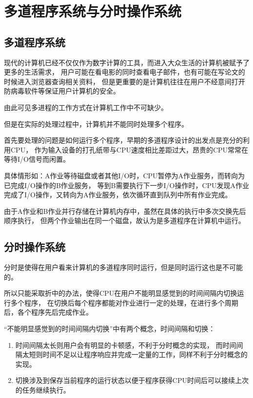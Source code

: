 \section{多道程序系统与分时操作系统}

\subsection{多道程序系统}

现代的计算机已经不仅仅作为数字计算的工具，而进入大众生活的计算机被赋予了更多的生活需求，
用户可能在看电影的同时查看电子邮件，也有可能在写论文的时候进入浏览器查询相关资料，
但是更重要的是计算机往往在用户不经意间打开防病毒软件等保证用户计算机的安全。

由此可见多进程的工作方式在计算机工作中不可缺少。

但是在实际的处理过程中，计算机并不能同时处理多个程序。

首先要处理的问题是如何运行多个程序，早期的多道程序设计的出发点是充分的利用CPU，
作为输入设备的打孔纸带与CPU速度相比差距过大，昂贵的CPU常常在等待I/O信号而闲置。

具体情形如：A作业等待磁盘或者其他I/O时，CPU暂停为A作业服务，而转向为已完成I/O操作的B作业服务，
等到B需要执行下一步I/O操作时，CPU发现A作业完成了I/O操作，又转向为A作业服务，依次循环直到队列中所有作业完成。

由于A作业和B作业并行存储在计算机内存中，虽然在具体的执行中多次交换先后顺序执行，
但两个作业输出在同一个磁盘，故认为是多道程序在计算机中运行。

\subsection{分时操作系统}

分时是使得在用户看来计算机的多道程序同时运行，但是同时运行这也是不可能的。

所以只能采取折中的办法，使得CPU在用户不能明显感觉到的时间间隔内切换运行多个程序，
在切换后每个程序都能对作业进行一定的处理，在进行多个周期后，各个程序先后完成作业。

“不能明显感觉到的时间间隔内切换”中有两个概念，时间间隔和切换：

\begin{enumerate}
    \item 时间间隔太长则用户会有明显的卡顿感，不利于分时概念的实现，
    而时间间隔太短则时间不足以让程序响应并完成一定量的工作，同样不利于分时概念的实现。
    \item 切换涉及到保存当前程序的运行状态以便于程序获得CPU时间后可以接续上次的任务继续执行。
  \end{enumerate}

